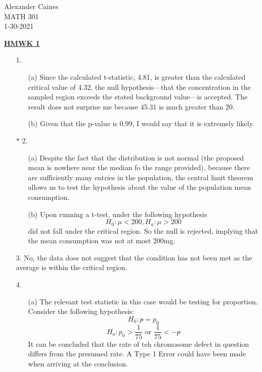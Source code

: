 \documentclass[12pt]{article}
\begin{document}
\vspace{1.0 \baselineskip}

\begin{flushright}
	Alexander Caines\\
	MATH 301\\
	1-30-2021\\
\end{flushright}

\begin{center}
	\textbf{\underline{HMWK 1}}
\end{center}



\begin{enumerate}
	\item[1.]
		\begin{enumerate}
			\item[(a)] Since the calculated t-statistic, 4.81, is greater than the calculated critical value 
				of 4.32, the null hypothesis---that the concentration in the sampled region exceeds the stated
				 background value---is accepted. The result does not surprise me because 45.31 is much greater than 20.
			\item[(b)] Given that the p-value is 0.99, I would say that it is extremely likely.
		\end{enumerate}
	\item[* 2.]
		\begin{enumerate}
			\item[(a)] Despite the fact that the distribution 
				is not normal (the proposed mean is nowhere near the median fo the range provided),
				because there are sufficiently 
				many entries in the population, the central 
				limit theorem allows us to test the hypothesis 
				about the value of the population mean consumption.

			\item[(b)] Upon running a t-test, under the following hypothesis $$H_0: \mu<200, H_a: \mu > 200$$
				did not fall under the critical region. So the null is rejected, implying that the mean consumption 
				was not at most 200mg.
		\end{enumerate}
	\item[3.] No, the data does not suggest that the condition has not 
		been met as the average is within the critical region.
	\item[4.]
		\begin{enumerate}
			\item[(a)] The relevant test statistic in this case would be testing for proportion. 
				Consider the following hypothesis: $$H_0: p\hat{}=p_0 $$
				$$H_a: p_0 > \frac{1}{75} \text{ or } \frac{1}{75} < -p\hat{}$$
				It can be concluded that the rate of teh chromosome defect in question 
				differs from the presumed rate. A Type 1 Error could have been made when arriving at the conclusion.


\end{enumerate}
\end{enumerate}
\end{document}
